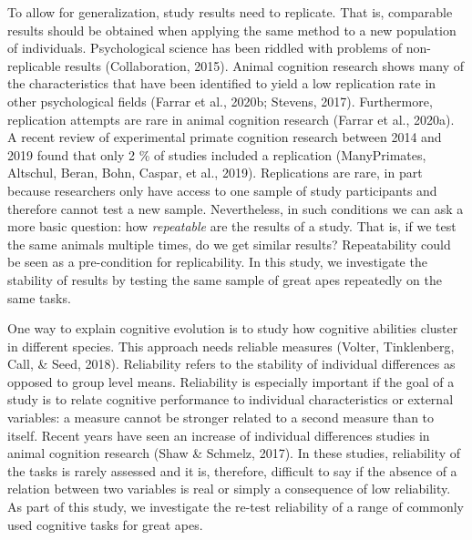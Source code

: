 \documentclass[10pt, letterpaper]{article}
\begin{document}
To allow for generalization, study results need to replicate. That is,
comparable results should be obtained when applying the same method to a
new population of individuals. Psychological science has been riddled
with problems of non-replicable results (Collaboration, 2015). Animal
cognition research shows many of the characteristics that have been
identified to yield a low replication rate in other psychological fields
(Farrar et al., 2020b; Stevens, 2017). Furthermore, replication attempts
are rare in animal cognition research (Farrar et al., 2020a). A recent
review of experimental primate cognition research between 2014 and 2019
found that only 2 \% of studies included a replication (ManyPrimates,
Altschul, Beran, Bohn, Caspar, et al., 2019). Replications are rare, in
part because researchers only have access to one sample of study
participants and therefore cannot test a new sample. Nevertheless, in
such conditions we can ask a more basic question: how \emph{repeatable}
are the results of a study. That is, if we test the same animals
multiple times, do we get similar results? Repeatability could be seen
as a pre-condition for replicability. In this study, we investigate the
stability of results by testing the same sample of great apes repeatedly
on the same tasks.

One way to explain cognitive evolution is to study how cognitive
abilities cluster in different species. This approach needs reliable
measures (Volter, Tinklenberg, Call, \& Seed, 2018). Reliability refers
to the stability of individual differences as opposed to group level
means. Reliability is especially important if the goal of a study is to
relate cognitive performance to individual characteristics or external
variables: a measure cannot be stronger related to a second measure than
to itself. Recent years have seen an increase of individual differences
studies in animal cognition research (Shaw \& Schmelz, 2017). In these
studies, reliability of the tasks is rarely assessed and it is,
therefore, difficult to say if the absence of a relation between two
variables is real or simply a consequence of low reliability. As part of
this study, we investigate the re-test reliability of a range of
commonly used cognitive tasks for great apes.
\end{document}

